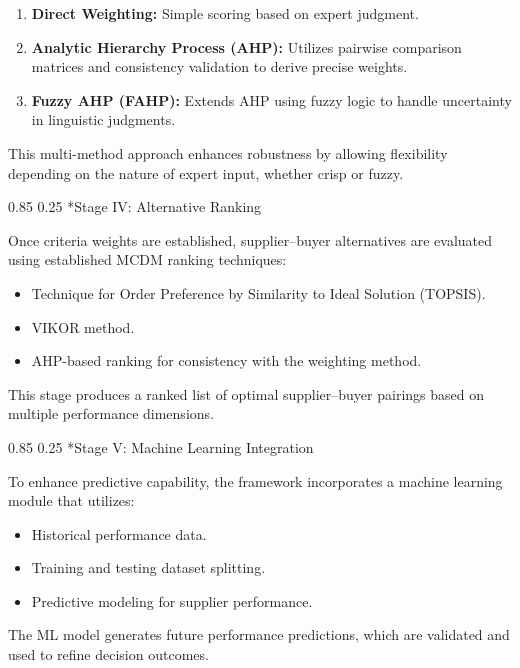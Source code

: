 \documentclass[11pt]{article}
\makeatletter
\renewcommand\paragraph{\@startsection{paragraph}{4}{\z@}%
  {0.85\baselineskip}%
  {0.25\baselineskip}%
  {\normalfont\normalsize\bfseries}}
\makeatother
\begin{document}
\begin{enumerate}
\item \textbf{Direct Weighting:} Simple scoring based on expert judgment.
\item \textbf{Analytic Hierarchy Process (AHP):} Utilizes pairwise comparison matrices and consistency validation to derive precise weights.
\item \textbf{Fuzzy AHP (FAHP):} Extends AHP using fuzzy logic to handle uncertainty in linguistic judgments.
\end{enumerate}

This multi-method approach enhances robustness by allowing flexibility depending on the nature of expert input, whether crisp or fuzzy.

\paragraph*{Stage IV: Alternative Ranking}

Once criteria weights are established, supplier--buyer alternatives are evaluated using established MCDM ranking techniques:

\begin{itemize}
\item Technique for Order Preference by Similarity to Ideal Solution (TOPSIS).
\item VIKOR method.
\item AHP-based ranking for consistency with the weighting method.
\end{itemize}

This stage produces a ranked list of optimal supplier--buyer pairings based on multiple performance dimensions.

\paragraph*{Stage V: Machine Learning Integration}

To enhance predictive capability, the framework incorporates a machine learning module that utilizes:

\begin{itemize}
\item Historical performance data.
\item Training and testing dataset splitting.
\item Predictive modeling for supplier performance.
\end{itemize}

The ML model generates future performance predictions, which are validated and used to refine decision outcomes.
\end{document}
